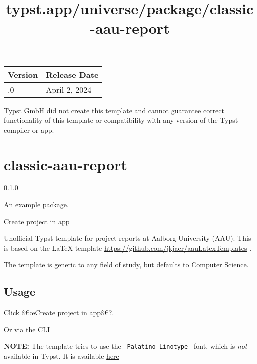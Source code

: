 \begin{longtable}[]{@{}ll@{}}
\toprule\noalign{}
Version & Release Date \\
\midrule\noalign{}
\endhead
\bottomrule\noalign{}
\endlastfoot
0.1.0 & April 2, 2024 \\
\end{longtable}

Typst GmbH did not create this template and cannot guarantee correct
functionality of this template or compatibility with any version of the
Typst compiler or app.


\title{typst.app/universe/package/classic-aau-report}

\label{banner}
\label{template-thumbnail}

\section{classic-aau-report}\label{classic-aau-report}

{ 0.1.0 }

An example package.

\href{/app?template=classic-aau-report&version=0.1.0}{Create project in
app}

\label{readme}
Unofficial Typst template for project reports at Aalborg University
(AAU). This is based on the LaTeX template
\url{https://github.com/jkjaer/aauLatexTemplates} .

The template is generic to any field of study, but defaults to Computer
Science.

\subsection{Usage}\label{usage}

Click â€œCreate project in appâ€?.

Or via the CLI

\begin{Shaded}
\begin{Highlighting}[]
\end{Highlighting}
\end{Shaded}

\textbf{NOTE:} The template tries to use the
\texttt{\ Palatino\ Linotype\ } font, which is \emph{not} available in
Typst. It is available
\href{https://github.com/Tinggaard/classic-aau-report/tree/main/fonts}{here}

